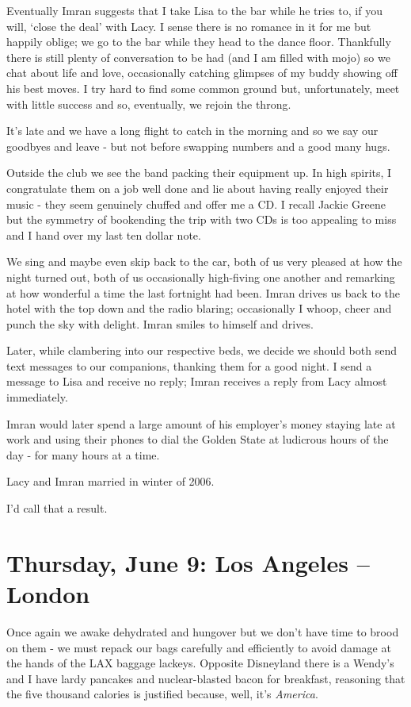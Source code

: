 \documentclass[a5paper,titlepage,11pt]{book}
\begin{document}
Eventually Imran suggests that I take Lisa to the bar while he tries to, if you will, `close the deal' with Lacy.  I sense there is no romance in it for me but happily oblige; we go to the bar while they head to the dance floor.  Thankfully there is still plenty of conversation to be had (and I am filled with mojo) so we chat about life and love, occasionally catching glimpses of my buddy showing off his best moves.  I try hard to find some common ground but, unfortunately, meet with little success and so, eventually, we rejoin the throng.

It's late and we have a long flight to catch in the morning and so we say our goodbyes and leave - but not before swapping numbers and a good many hugs.

Outside the club we see the band packing their equipment up.  In high spirits, I congratulate them on a job well done and lie about having really enjoyed their music - they seem genuinely chuffed and offer me a CD.  I recall Jackie Greene but the symmetry of bookending the trip with two CDs is too appealing to miss and I hand over my last ten dollar note.

We sing and maybe even skip back to the car, both of us very pleased at how the night turned out, both of us occasionally high-fiving one another and remarking at how wonderful a time the last fortnight had been.  Imran drives us back to the hotel with the top down and the radio blaring; occasionally I whoop, cheer and punch the sky with delight.  Imran smiles to himself and drives.

Later, while clambering into our respective beds, we decide we should both send text messages to our companions, thanking them for a good night.  I send a message to Lisa and receive no reply; Imran receives a reply from Lacy almost immediately.

Imran would later spend a large amount of his employer's money staying late at work and using their phones to dial the Golden State at ludicrous hours of the day - for many hours at a time.

Lacy and Imran married in winter of 2006.

I'd call that a result.


\chapter[Los Angeles -- London]{Thursday, June 9: Los Angeles -- London}
Once again we awake dehydrated and hungover but we don't have time to brood on them - we must repack our bags carefully and efficiently to avoid damage at the hands of the LAX baggage lackeys.  Opposite Disneyland there is a Wendy's and I have lardy pancakes and nuclear-blasted bacon for breakfast, reasoning that the five thousand calories is justified because, well, it's \emph{America}.
\end{document}

